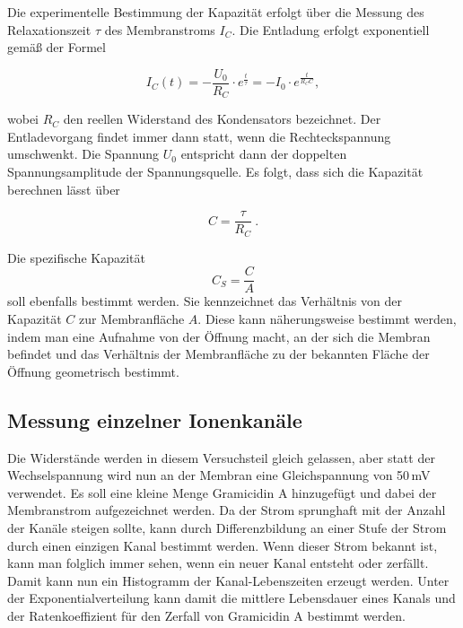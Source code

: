 \documentclass[a4paper,ngerman]{scrartcl}
\begin{document}
Die experimentelle Bestimmung der Kapazität erfolgt über die Messung des Relaxationszeit $\tau$ des Membranstroms $I_C$. Die Entladung erfolgt
exponentiell gemäß der Formel

\begin{equation}
  I_C(t) = - \frac{U_0}{R_C} \cdot e^{\frac{t}{\tau}} = - I_0 \cdot e^{\frac{t}{R_C C}},
\end{equation}

wobei $R_C$ den reellen Widerstand des Kondensators bezeichnet. Der Entladevorgang findet immer dann statt, wenn die Rechteckspannung umschwenkt. Die Spannung $U_0$ entspricht dann der doppelten Spannungsamplitude der Spannungsquelle.
Es folgt, dass sich die Kapazität berechnen lässt über

\begin{equation}
  C = \frac{\tau}{R_C}~.
\end{equation}

Die spezifische Kapazität
\begin{equation}
  C_S = \frac{C}{A}
\end{equation}
soll ebenfalls bestimmt werden. 
Sie kennzeichnet das Verhältnis von der Kapazität $C$ zur Membranfläche $A$.
Diese kann näherungsweise bestimmt werden, indem man eine Aufnahme von der Öffnung macht, an der sich die Membran befindet und das Verhältnis der Membranfläche zu der bekannten Fläche der Öffnung geometrisch bestimmt.

\subsection{Messung einzelner Ionenkanäle}
\label{sec:singlechannels}
Die Widerstände werden in diesem Versuchsteil gleich gelassen, aber statt der Wechselspannung wird nun an der Membran eine Gleichspannung 
von 50\,mV verwendet. Es soll eine kleine Menge Gramicidin A hinzugefügt und dabei der Membranstrom aufgezeichnet werden. Da der Strom 
sprunghaft mit der Anzahl der Kanäle steigen sollte, kann durch Differenzbildung an einer Stufe der Strom durch einen einzigen Kanal bestimmt werden. Wenn dieser Strom bekannt ist, kann man folglich immer sehen, wenn ein neuer Kanal entsteht oder zerfällt.\\

Damit kann nun ein Histogramm der Kanal-Lebenszeiten erzeugt werden. Unter der Exponentialverteilung kann damit die mittlere Lebensdauer 
eines Kanals und der Ratenkoeffizient für den Zerfall von Gramicidin A bestimmt werden.
\end{document}
